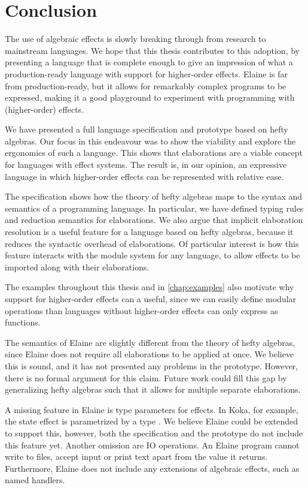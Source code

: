 \chapter{Conclusion}\label{chap:conclusion}

The use of algebraic effects is slowly breaking through from research to mainstream languages. We hope that this thesis contributes to this adoption, by presenting a language that is complete enough to give an impression of what a production-ready language with support for higher-order effects. Elaine is far from production-ready, but it allows for remarkably complex programs to be expressed, making it a good playground to experiment with programming with (higher-order) effects.

We have presented a full language specification and prototype based on hefty algebras. Our focus in this endeavour was to show the viability and explore the ergonomics of such a language. This shows that elaborations are a viable concept for languages with effect systems. The result is, in our opinion, an expressive language in which higher-order effects can be represented with relative ease.

The specification shows how the theory of hefty algebras maps to the syntax and semantics of a programming language. In particular, we have defined typing rules and reduction semantics for elaborations. We also argue that implicit elaboration resolution is a useful feature for a language based on hefty algebras, because it reduces the syntactic overhead of elaborations. Of particular interest is how this feature interacts with the module system for any language, to allow effects to be imported along with their elaborations.

The examples throughout this thesis and in \cref{chap:examples} also motivate why support for higher-order effects can a useful, since we can easily define modular operations than languages without higher-order effects can only express as functions.

The semantics of Elaine are slightly different from the theory of hefty algebras, since Elaine does not require all elaborations to be applied at once. We believe this is sound, and it has not presented any problems in the prototype. However, there is no formal argument for this claim. Future work could fill this gap by generalizing hefty algebras such that it allows for multiple separate elaborations.

A missing feature in Elaine is type parameters for effects. In Koka, for example, the state effect  is parametrized by a type . We believe Elaine could be extended to support this, however, both the specification and the prototype do not include this feature yet. Another omission are IO operations. An Elaine program cannot write to files, accept input or print text apart from the value it returns. Furthermore, Elaine does not include any extensions of algebraic effects, such as named handlers.

